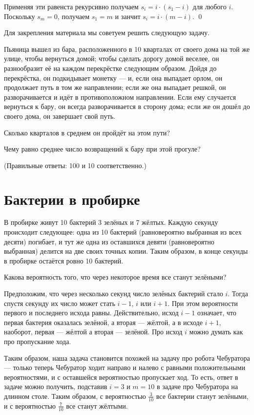 \documentclass{article}
\begin{document}
Применяя эти равенста рекурсивно получаем
$s_i=i\cdot(s_1-i)$
для любого $i$.
Поскольку $s_m=0$, получаем $s_1=m$ и занчит
$s_i=i\cdot(m-i)$.
\qed
\medskip

Для закрепления материала мы советуем решить следующую задачу.

Пьяница вышел из бара, расположенного в 10 кварталах от своего дома на той же улице, чтобы вернуться домой; 
чтобы сделать дорогу домой веселее, он разнообразит её на каждом перекрёстке следующим образом. 
Дойдя до перекрёстка, он подкидывает монетку --- и, если она выпадает орлом, он продолжает путь в том же направлении; если же она выпадает решкой, он разворачивается и идёт в противоположном направлении. 
Если ему случается вернуться к бару, он всегда разворачивается в сторону дома; если же он дошёл до своего дома, он завершает свой путь. 

Сколько кварталов в среднем он пройдёт на этом пути?

Чему равно среднее число возвращений к бару при этой прогуле?

(Правильные ответы: 100 и 10 соответственно.)


\section{Бактерии в пробирке}

В пробирке живут 10 бактерий 3 зелёных и 7 жёлтых.
Каждую секунду происходит следующее: одна из 10 бактерий (равновероятно выбранная из всех десяти) погибает,
и тут же одна из оставшихся девяти (равновероятно выбранная)
 делится на две своих точных копии.
Таким образом,
в конце секунды в пробирке остаётся ровно 10 бактерий.

Какова вероятность того, что через некоторое время все станут зелёными?


Предположим, что через несколько секунд 
число зелёных бактерий стало $i$.
Тогда спустя секунду их число может стать $i-1$, $i$ или $i+1$.
При этом вероятности первого и последнего исхода равны.
Действительно, исход $i-1$ означает, 
что первая бактерия оказалась зелёной, а вторая --- жёлтой,
а в исходе $i+1$,
наоборот, первая --- жёлтой а вторая --- зелёной.
Про исход $i$ можно думать как про пропускание хода.

Таким образом, наша задача становится похожей на задачу про робота Чебуратора --- только теперь Чебуратор ходит направо и налево с равными положительными вероятностями, и с оставшейся вероятностью пропускает ход.
То есть, ответ в задаче можно получить, подставив $i=3$ и $m=10$ в задаче про Чебуратора на длинном столе.
Таким образом, с вероятностью $\tfrac{3}{10}$ все бактерии станут зелёными, 
и с вероятностью $\tfrac{7}{10}$ все станут жёлтыми.
\end{document}
